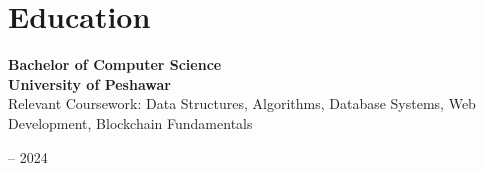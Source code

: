 \documentclass[10pt, letterpaper]{article}
\newenvironment{highlights}{
    \begin{itemize}[
        topsep=0.10 cm,
        parsep=0.10 cm,
        partopsep=0pt,
        itemsep=0pt,
        leftmargin=0.4 cm + 10pt
    ]
}{
    \end{itemize}
}
\newenvironment{threecolentry}[3][]{
    \onecolentry
    \def\thirdColumn{#3}
    \setcolumnwidth{1 cm, \fill, 4.5 cm}
    \begin{paracol}{3}
    {\raggedright #2} \switchcolumn
}{
    \switchcolumn \raggedleft \thirdColumn
    \end{paracol}
    \endonecolentry
}
\begin{document}
\section{Education}

\begin{threecolentry}{}{
		2020 – 2024
	}
	\textbf{Bachelor of Computer Science} \\
	\textbf{University of Peshawar }\\
	Relevant Coursework: Data Structures, Algorithms, Database Systems, Web Development, Blockchain Fundamentals
\end{threecolentry}

\end{document}
